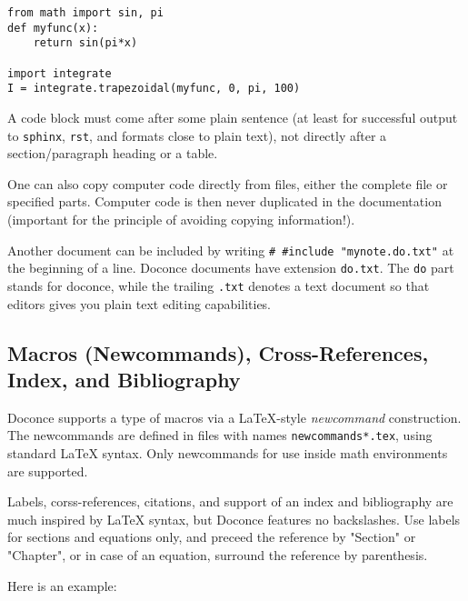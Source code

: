 \documentclass[%
oneside,                 %
final,                   %
10pt]{article}
\begin{document}
\begin{verbatim}
from math import sin, pi
def myfunc(x):
    return sin(pi*x)

import integrate
I = integrate.trapezoidal(myfunc, 0, pi, 100)
\end{verbatim}
\noindent
A code block must come after some plain sentence (at least for successful
output to {\fontsize{10pt}{10pt}\Verb!sphinx!}, {\fontsize{10pt}{10pt}\Verb!rst!}, and formats close to plain text),
not directly after a section/paragraph heading or a table.


One can also copy computer code directly from files, either the
complete file or specified parts.  Computer code is then never
duplicated in the documentation (important for the principle of
avoiding copying information!).

Another document can be included by writing {\fontsize{10pt}{10pt}\Verb!# #include "mynote.do.txt"!}
at the beginning of a line.  Doconce documents have
extension {\fontsize{10pt}{10pt}\Verb!do.txt!}. The {\fontsize{10pt}{10pt}\Verb!do!} part stands for doconce, while the
trailing {\fontsize{10pt}{10pt}\Verb!.txt!} denotes a text document so that editors gives you
plain text editing capabilities.


\subsection{Macros (Newcommands), Cross-References, Index, and Bibliography}
\label{newcommands}

Doconce supports a type of macros via a LaTeX-style \emph{newcommand}
construction.  The newcommands are defined in files with names
{\fontsize{10pt}{10pt}\Verb!newcommands*.tex!}, using standard {\LaTeX} syntax. Only newcommands
for use inside math environments are supported.

Labels, corss-references, citations, and support of an index and
bibliography are much inspired by {\LaTeX} syntax, but Doconce features
no backslashes. Use labels for sections and equations only, and
preceed the reference by "Section" or "Chapter", or in case of
an equation, surround the reference by parenthesis.

Here is an example:
\end{document}
